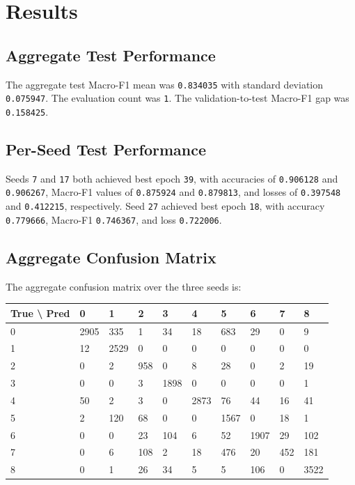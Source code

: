 \documentclass[10pt]{article}
\begin{document}
\section{Results}
\subsection{Aggregate Test Performance}
The aggregate test Macro-F1 mean was \texttt{0.834035} with standard deviation \texttt{0.075947}. The evaluation count was \texttt{1}. The validation-to-test Macro-F1 gap was \texttt{0.158425}.
\subsection{Per-Seed Test Performance}
Seeds \texttt{7} and \texttt{17} both achieved best epoch \texttt{39}, with accuracies of \texttt{0.906128} and \texttt{0.906267}, Macro-F1 values of \texttt{0.875924} and \texttt{0.879813}, and losses of \texttt{0.397548} and \texttt{0.412215}, respectively. Seed \texttt{27} achieved best epoch \texttt{18}, with accuracy \texttt{0.779666}, Macro-F1 \texttt{0.746367}, and loss \texttt{0.722006}.
\subsection{Aggregate Confusion Matrix}
The aggregate confusion matrix over the three seeds is:
\begin{longtable}{p{}p{}p{}p{}p{}p{}p{}p{}p{}p{}}
\toprule
True \textbackslash{} Pred & 0 & 1 & 2 & 3 & 4 & 5 & 6 & 7 & 8 \\
\midrule \endhead
0 & 2905 & 335 & 1 & 34 & 18 & 683 & 29 & 0 & 9 \\
1 & 12 & 2529 & 0 & 0 & 0 & 0 & 0 & 0 & 0 \\
2 & 0 & 2 & 958 & 0 & 8 & 28 & 0 & 2 & 19 \\
3 & 0 & 0 & 3 & 1898 & 0 & 0 & 0 & 0 & 1 \\
4 & 50 & 2 & 3 & 0 & 2873 & 76 & 44 & 16 & 41 \\
5 & 2 & 120 & 68 & 0 & 0 & 1567 & 0 & 18 & 1 \\
6 & 0 & 0 & 23 & 104 & 6 & 52 & 1907 & 29 & 102 \\
7 & 0 & 6 & 108 & 2 & 18 & 476 & 20 & 452 & 181 \\
8 & 0 & 1 & 26 & 34 & 5 & 5 & 106 & 0 & 3522 \\
\bottomrule\end{longtable}
\end{document}
